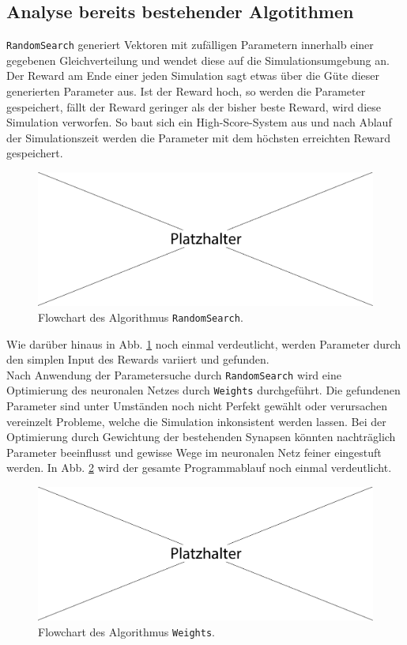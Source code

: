 	\subsection{Analyse bereits bestehender Algotithmen}
		\texttt{RandomSearch} generiert Vektoren mit zufälligen Parametern innerhalb einer gegebenen Gleichverteilung und wendet diese auf die Simulationsumgebung an. Der Reward am Ende einer jeden Simulation sagt etwas über die Güte dieser generierten Parameter aus. Ist der Reward hoch, so werden die Parameter gespeichert, fällt der Reward geringer als der bisher beste Reward, wird diese Simulation verworfen. So baut sich ein High-Score-System aus und nach Ablauf der Simulationszeit werden die Parameter mit dem höchsten erreichten Reward gespeichert.
		\begin{figure}[!h] %
			\centering
			\includegraphics[width=12cm]{figures/sonstiges/platzhalter.pdf}
			\caption{Flowchart des Algorithmus \texttt{RandomSearch}.}
			\label{fig:erg_rs_flow}
		\end{figure}
		Wie darüber hinaus in Abb. \ref{fig:erg_rs_flow} noch einmal verdeutlicht, werden Parameter durch den simplen Input des Rewards variiert und gefunden.\\
		Nach Anwendung der Parametersuche durch \texttt{RandomSearch} wird eine Optimierung des neuronalen Netzes durch \texttt{Weights} durchgeführt. Die gefundenen Parameter sind unter Umständen noch nicht Perfekt gewählt oder verursachen vereinzelt Probleme, welche die Simulation inkonsistent werden lassen. Bei der Optimierung durch Gewichtung der bestehenden Synapsen könnten nachträglich Parameter beeinflusst und gewisse Wege im neuronalen Netz feiner eingestuft werden. In Abb. \ref{fig:erg_w_flow} wird der gesamte Programmablauf noch einmal verdeutlicht.
		\begin{figure}[!h] %
			\centering
			\includegraphics[width=12cm]{figures/sonstiges/platzhalter.pdf}
			\caption{Flowchart des Algorithmus \texttt{Weights}.}
			\label{fig:erg_w_flow}
		\end{figure}
